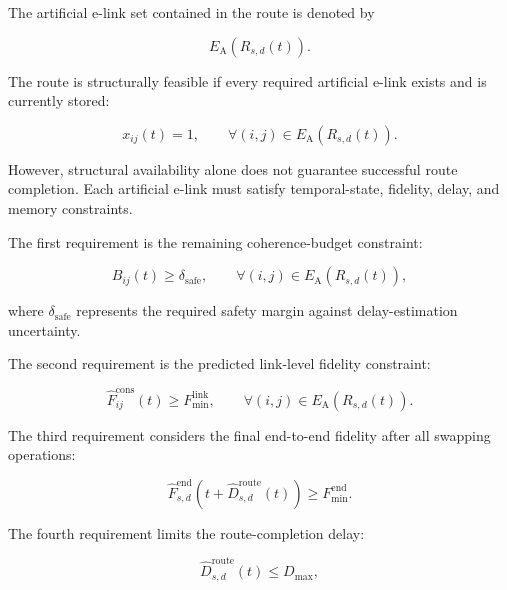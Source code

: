 The artificial e-link set contained in the route is denoted by

\begin{equation}
    E_{\mathrm{A}}
    \left(
    R_{s,d}(t)
    \right).
\end{equation}

The route is structurally feasible if every required artificial e-link exists and is currently stored:

\begin{equation}
    x_{ij}(t)
    =
    1,
    \qquad
    \forall (i,j)
    \in
    E_{\mathrm{A}}
    \left(
    R_{s,d}(t)
    \right).
\end{equation}

However, structural availability alone does not guarantee successful route completion. Each artificial e-link must satisfy temporal-state, fidelity, delay, and memory constraints.

The first requirement is the remaining coherence-budget constraint:

\begin{equation}
    B_{ij}(t)
    \geq
    \delta_{\mathrm{safe}},
    \qquad
    \forall (i,j)
    \in
    E_{\mathrm{A}}
    \left(
    R_{s,d}(t)
    \right),
\end{equation}

where $\delta_{\mathrm{safe}}$ represents the required safety margin against delay-estimation uncertainty.

The second requirement is the predicted link-level fidelity constraint:

\begin{equation}
    \widehat{F}_{ij}^{\mathrm{cons}}(t)
    \geq
    F_{\min}^{\mathrm{link}},
    \qquad
    \forall (i,j)
    \in
    E_{\mathrm{A}}
    \left(
    R_{s,d}(t)
    \right).
\end{equation}

The third requirement considers the final end-to-end fidelity after all swapping operations:

\begin{equation}
    \widehat{F}_{s,d}^{\mathrm{end}}
    \left(
    t+
    \widehat{D}_{s,d}^{\mathrm{route}}(t)
    \right)
    \geq
    F_{\min}^{\mathrm{end}}.
\end{equation}

The fourth requirement limits the route-completion delay:

\begin{equation}
    \widehat{D}_{s,d}^{\mathrm{route}}(t)
    \leq
    D_{\max},
\end{equation}

